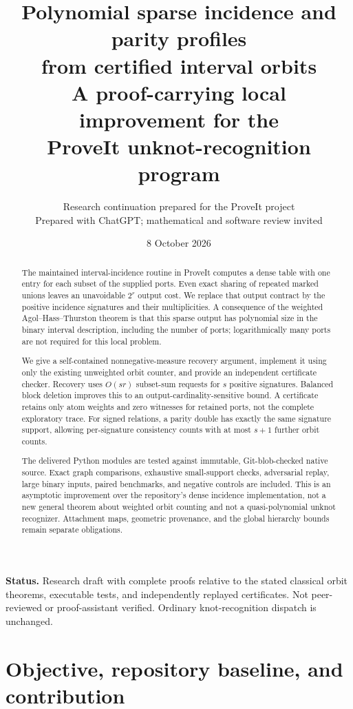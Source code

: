 \documentclass[11pt,letterpaper]{article}
\title{\textbf{Polynomial sparse incidence and parity profiles\\from certified interval orbits}\\[0.6em]
\large A proof-carrying local improvement for the\\ProveIt unknot-recognition program}
\author{Research continuation prepared for the ProveIt project\\\small Prepared with ChatGPT; mathematical and software review invited}
\date{8 October 2026}
\theoremstyle{definition}\newtheorem{definition}[theorem]{Definition}
\theoremstyle{remark}\newtheorem{remark}[theorem]{Remark}
\begin{document}
\maketitle
\begin{abstract}
The maintained interval-incidence routine in ProveIt computes a dense table with one entry for each subset of the supplied ports. Even exact sharing of repeated marked unions leaves an unavoidable $2^r$ output cost. We replace that output contract by the positive incidence signatures and their multiplicities. A consequence of the weighted Agol--Hass--Thurston theorem is that this sparse output has polynomial size in the binary interval description, including the number of ports; logarithmically many ports are not required for this local problem.

We give a self-contained nonnegative-measure recovery argument, implement it using only the existing unweighted orbit counter, and provide an independent certificate checker. Recovery uses $O(sr)$ subset-sum requests for $s$ positive signatures. Balanced block deletion improves this to an output-cardinality-sensitive bound. A certificate retains only atom weights and zero witnesses for retained ports, not the complete exploratory trace. For signed relations, a parity double has exactly the same signature support, allowing per-signature consistency counts with at most $s+1$ further orbit counts.

The delivered Python modules are tested against immutable, Git-blob-checked native source. Exact graph comparisons, exhaustive small-support checks, adversarial replay, large binary inputs, paired benchmarks, and negative controls are included. This is an asymptotic improvement over the repository's dense incidence implementation, not a new general theorem about weighted orbit counting and not a quasi-polynomial unknot recognizer. Attachment maps, geometric provenance, and the global hierarchy bounds remain separate obligations.
\end{abstract}
\vfill
\noindent\textbf{Status.} Research draft with complete proofs relative to the stated classical orbit theorems, executable tests, and independently replayed certificates. Not peer-reviewed or proof-assistant verified. Ordinary knot-recognition dispatch is unchanged.
\newpage
\begingroup
\fontsize{9}{10.8}\selectfont
\setlength{\parskip}{0pt}
\tableofcontents
\endgroup
\newpage

\section{Objective, repository baseline, and contribution}
\label{sec:scope}
\end{document}

